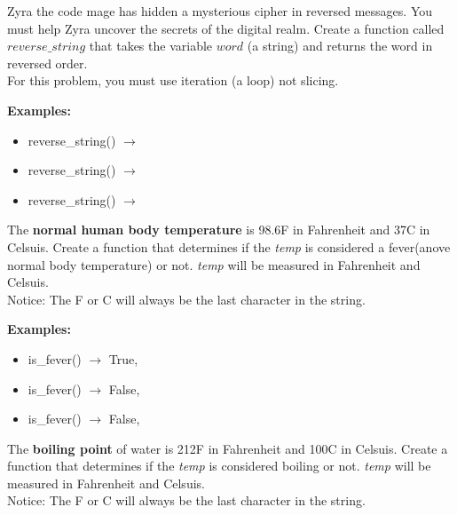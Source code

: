 



	\item 
		Zyra the code mage has hidden a mysterious cipher in reversed messages. 
		You must help Zyra uncover the secrets of the digital realm. 
		Create a function called $reverse\_string$ that takes the variable $word$ 
		(a string) and returns the word in reversed order. \\
		For this problem, you must use iteration (a loop) not slicing.

	\textbf{Examples:}
		\begin{itemize}
			\item reverse\_string() $\rightarrow$ 
			\item reverse\_string() $\rightarrow$ 
			\item reverse\_string() $\rightarrow$ 
		\end{itemize}


	\item 
		The \textbf{normal human body temperature} is 98.6F in Fahrenheit and 37C in Celsuis. 
		Create a function that determines if the \textit{temp} is considered a fever(anove normal 
		body temperature) or not.
		\textit{temp} will be measured in Fahrenheit and Celsuis.\\
		Notice: The F or C will always be the last character in the string.

	\textbf{Examples:}
	\begin{itemize}
		\item is\_fever() $\rightarrow$ True, 
		\item is\_fever() $\rightarrow$ False, 
		\item is\_fever() $\rightarrow$ False, 
	\end{itemize}

	\item 
		The \textbf{boiling point} of water is 212F in Fahrenheit and 100C in Celsuis. 
		Create a function that determines if the \textit{temp} is considered boiling or not.
		\textit{temp} will be measured in Fahrenheit and Celsuis.\\
		Notice: The F or C will always be the last character in the string.

